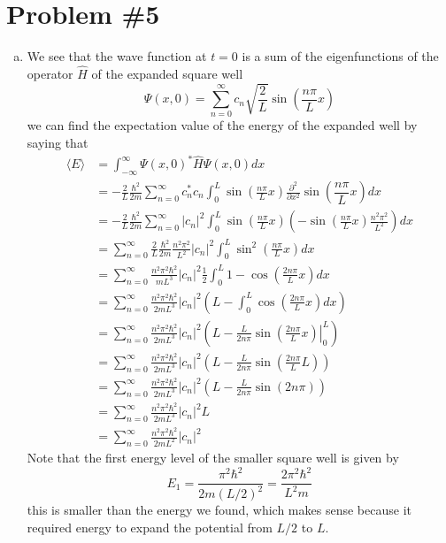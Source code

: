 \documentclass[11pt]{article}
\numberwithin{equation}{section}
\newcommand{\expt}[1]{\langle{#1}\rangle}
\begin{document}
\section{Problem \#5}
\begin{enumerate}[(a)]
\item
We see that the wave function at $t=0$ is a sum of the eigenfunctions of the operator $\hat{H}$ of the expanded square well
$$\Psi(x,0) = \sum_{n=0}^{\infty}c_n\sqrt{\frac{2}{L}}\sin\left(\frac{n\pi}{L}x\right)$$
we can find the expectation value of the energy of the expanded well by saying that 
\begin{align*}
\expt{E} &= \int_{-\infty}^{\infty}\Psi(x,0)^*\hat{H}\Psi(x,0)dx\\
&= -\frac{2}{L}\frac{\hbar^2}{2m}\sum_{n=0}^{\infty}c_n^*c_n\int_{0}^{L}\sin\left(\frac{n\pi}{L}x\right)\frac{\partial^2}{\partial x^2}\sin\left(\dfrac{n\pi}{L}x\right)dx\\
&= -\frac{2}{L}\frac{\hbar^2}{2m}\sum_{n=0}^{\infty}|c_n|^2\int_{0}^{L}\sin\left(\frac{n\pi}{L}x\right)\left(-\sin\left(\frac{n\pi}{L}x\right)\frac{n^2\pi^2}{L^2}\right)dx\\
&= \sum_{n=0}^{\infty}\frac{2}{L}\frac{\hbar^2}{2m}\frac{n^2\pi^2}{L^2}|c_n|^2\int_{0}^{L}\sin^2\left(\frac{n\pi}{L}x\right)dx\\
&= \sum_{n=0}^{\infty}\frac{n^2\pi^2\hbar^2}{mL^3}|c_n|^2\frac{1}{2}\int_{0}^{L}1-\cos\left(\frac{2n\pi}{L}x\right)dx\\
&= \sum_{n=0}^{\infty}\frac{n^2\pi^2\hbar^2}{2mL^3}|c_n|^2\left(L-\int_{0}^{L}\cos\left(\frac{2n\pi}{L}x\right)dx\right)\\
&= \sum_{n=0}^{\infty}\frac{n^2\pi^2\hbar^2}{2mL^3}|c_n|^2\left(L-\frac{L}{2n\pi}\left.\sin\left(\frac{2n\pi}{L}x\right)\right|_0^L\right)\\
&= \sum_{n=0}^{\infty}\frac{n^2\pi^2\hbar^2}{2mL^3}|c_n|^2\left(L-\frac{L}{2n\pi}\sin\left(\frac{2n\pi}{L}L\right)\right)\\
&= \sum_{n=0}^{\infty}\frac{n^2\pi^2\hbar^2}{2mL^3}|c_n|^2\left(L-\frac{L}{2n\pi}\sin\left(2n\pi\right)\right)\\
&= \sum_{n=0}^{\infty}\frac{n^2\pi^2\hbar^2}{2mL^3}|c_n|^2L\\
&= \sum_{n=0}^{\infty}\frac{n^2\pi^2\hbar^2}{2mL^2}|c_n|^2
\end{align*}
Note that the first energy level of the smaller square well is given by
$$E_1 = \frac{\pi^2\hbar^2}{2m(L/2)^2} = \frac{2\pi^2\hbar^2}{L^2m}$$
this is smaller than the energy we found, which makes sense because it required energy to expand the potential from $L/2$ to $L$.


\end{enumerate}
\end{document}
